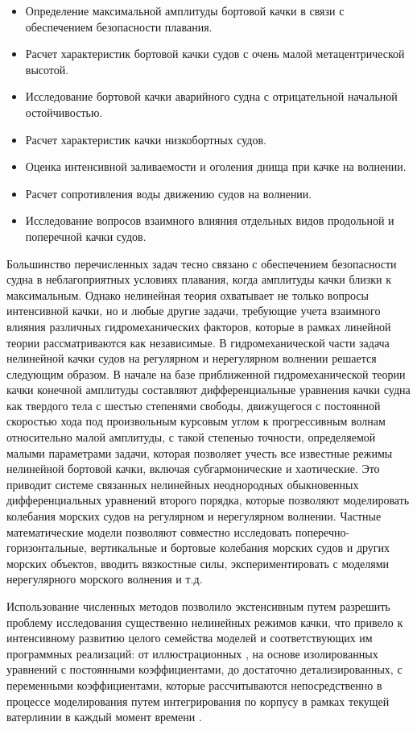 \begin{itemize}
\item	Определение максимальной амплитуды бортовой качки в связи с обеспечением безопасности плавания.
\item	Расчет характеристик бортовой качки судов с очень малой метацентрической высотой.
\item	Исследование бортовой качки аварийного судна с отрицательной начальной остойчивостью.
\item	Расчет характеристик качки низкобортных судов.
\item	Оценка интенсивной заливаемости и оголения днища при качке на волнении.
\item	Расчет сопротивления воды движению судов на волнении.
\item	Исследование вопросов взаимного влияния отдельных видов продольной и поперечной качки судов.
\end{itemize}

Большинство перечисленных задач тесно связано с обеспечением безопасности судна в неблагоприятных условиях плавания, когда амплитуды качки близки к максимальным. Однако нелинейная теория охватывает не только вопросы интенсивной качки, но и любые другие задачи, требующие учета взаимного влияния различных гидромеханических факторов, которые в рамках линейной теории рассматриваются как независимые. В гидромеханической части задача нелинейной качки судов на регулярном и нерегулярном волнении решается следующим образом. В начале на базе приближенной гидромеханической теории качки конечной амплитуды составляют дифференциальные уравнения качки судна как твердого тела с шестью степенями свободы, движущегося с постоянной скоростью хода под произвольным курсовым углом к прогрессивным волнам относительно малой амплитуды, с такой степенью точности, определяемой малыми параметрами задачи, которая позволяет учесть все известные режимы нелинейной бортовой качки, включая субгармонические и хаотические. Это приводит системе связанных нелинейных неоднородных обыкновенных дифференциальных уравнений второго порядка, которые позволяют моделировать колебания морских судов на регулярном и нерегулярном волнении. Частные математические модели позволяют совместно исследовать поперечно-горизонтальные, вертикальные и бортовые колебания морских судов и других морских объектов, вводить вязкостные силы, экспериментировать с моделями нерегулярного морского волнения и т.д.

Использование численных методов позволило экстенсивным путем разрешить проблему исследования существенно нелинейных режимов качки, что привело к интенсивному развитию целого семейства моделей и соответствующих им программных реализаций: от иллюстрационных \citep{dk19}\citep{dk20}, на основе изолированных уравнений с постоянными коэффициентами, до достаточно детализированных, с переменными коэффициентами, которые рассчитываются непосредственно в процессе моделирования путем интегрирования по корпусу в рамках текущей ватерлинии в каждый момент времени \citep{dk21}\citep{dk22}.

